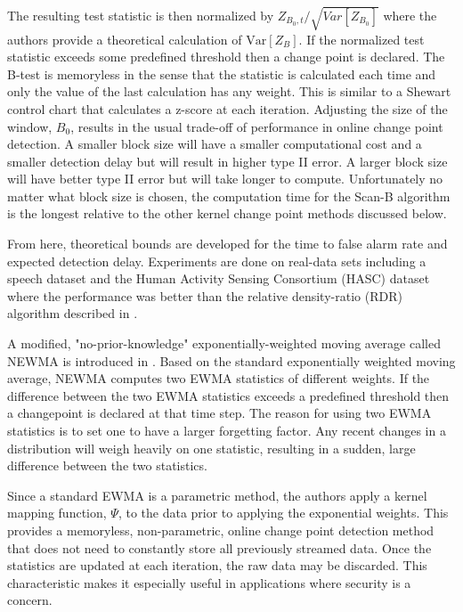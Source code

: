 The resulting test statistic is then normalized by $Z_{B_{0}, t}/\sqrt{Var[Z_{B_0}]}$ where the authors provide a theoretical calculation of $\text{Var}[Z_B]$. If the normalized test statistic exceeds some predefined threshold then a change point is declared. The B-test is memoryless in the sense that the statistic is calculated each time and only the value of the last calculation has any weight. This is similar to a Shewart control chart that calculates a z-score at each iteration. Adjusting the size of the window, $B_0$, results in the usual trade-off of performance in online change point detection. A smaller block size will have a smaller computational cost and a smaller detection delay but will result in higher type II error. A larger block size will have better type II error but will take longer to compute. Unfortunately no matter what block size is chosen, the computation time for the Scan-B algorithm is the longest relative to the other kernel change point methods discussed below. 

From here, theoretical bounds are developed for the time to false alarm rate and expected detection delay. Experiments are done on real-data sets including a speech dataset  and the Human Activity Sensing Consortium (HASC) dataset where the performance was better than the relative density-ratio (RDR) algorithm described in \cite{liu2013change}.


A modified, "no-prior-knowledge" exponentially-weighted moving average called NEWMA is introduced in \cite{keriven2018newma}. Based on the standard exponentially weighted moving average, NEWMA computes two EWMA statistics of different weights. If the difference between the two EWMA statistics exceeds a predefined threshold then a changepoint is declared at that time step. The reason for using two EWMA statistics is to set one to have a larger forgetting factor. Any recent changes in a distribution will weigh heavily on one statistic, resulting in a sudden, large difference between the two statistics. 

Since a standard EWMA is a parametric method, the authors apply a kernel mapping function, $\Psi$, to the data prior to applying the exponential weights. This provides a memoryless, non-parametric, online change point detection method that does not need to constantly store all previously streamed data. Once the statistics are updated at each iteration, the raw data may be discarded. This characteristic makes it especially useful in applications where security is a concern.

